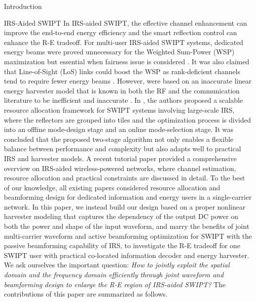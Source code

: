 \documentclass[journal]{IEEEtran}
\begin{document}
\begin{section}{Introduction}
		\begin{subsection}{IRS-Aided SWIPT}
			In IRS-aided SWIPT, the effective channel enhancement can improve the end-to-end energy efficiency and the smart reflection control can enhance the R-E tradeoff. For multi-user IRS-aided SWIPT systems, dedicated energy beams were proved unnecessary for the Weighted Sum-Power (WSP) maximization \cite{Wu2020b} but essential when fairness issue is considered \cite{Tang2019}. It was also claimed that Line-of-Sight (LoS) links could boost the WSP as rank-deficient channels tend to require fewer energy beams \cite{Wu2020a}. However, \cite{Wu2020b,Tang2019,Wu2020a} were based on an inaccurate linear energy harvester model that is known in both the RF and the communication literature to be inefficient and inaccurate \cite{Clerckx2019,Trotter2009,Clerckx2018,Clerckx2016a,Kim2019,Kim2020a,Kim2021,Clerckx2017,Kim2017,Clerckx2018b,Varasteh2020,Varasteh2019d,Varasteh2020a}. In \cite{Xu2021}, the authors proposed a scalable resource allocation framework for SWIPT systems involving large-scale IRS, where the reflectors are grouped into tiles and the optimization process is divided into an offline mode-design stage and an online mode-selection stage. It was concluded that the proposed two-stage algorithm not only enables a flexible balance between performance and complexity but also adapts well to practical IRS and harvester models. A recent tutorial paper \cite{Wu2021c} provided a comprehensive overview on IRS-aided wireless-powered networks, where channel estimation, resource allocation and practical constraints are discussed in detail. To the best of our knowledge, all existing papers considered resource allocation and beamforming design for dedicated information and energy users in a single-carrier network. In this paper, we instead build our design based on a proper nonlinear harvester modeling that captures the dependency of the output DC power on both the power and shape of the input waveform, and marry the benefits of joint multi-carrier waveform and active beamforming optimization for SWIPT with the passive beamforming capability of IRS, to investigate the R-E tradeoff for one SWIPT user with practical co-located information decoder and energy harvester. We ask ourselves the important question: \emph{How to jointly exploit the spatial domain and the frequency domain efficiently through joint waveform and beamforming design to enlarge the R-E region of IRS-aided SWIPT?} The contributions of this paper are summarized as follows.


\end{subsection}
\end{section}
\end{document}

